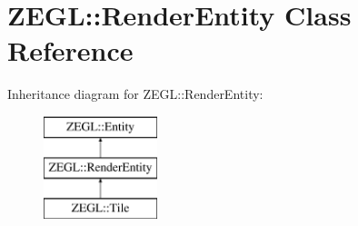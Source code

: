\hypertarget{class_z_e_g_l_1_1_render_entity}{}\section{Z\+E\+G\+L\+:\+:Render\+Entity Class Reference}
\label{class_z_e_g_l_1_1_render_entity}
Inheritance diagram for Z\+E\+G\+L\+:\+:Render\+Entity\+:\begin{figure}[H]
\begin{center}
\leavevmode
\includegraphics[height=3.000000cm]{class_z_e_g_l_1_1_render_entity}
\end{center}
\end{figure}
